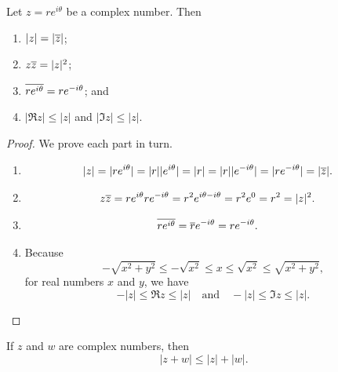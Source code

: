 \begin{theorem}
    Let \(z = re^{i\theta}\) be a complex number. Then
    \begin{enumerate}[label=(\alph*)]
        \item \(|z| = |\overline{z}|\);
        \item \(z\overline{z} = |z|^2\);
        \item \(\overline{re^{i\theta}} = re^{-i\theta}\); and
        \item \(|\Re z| \leq |z|\) and \(|\Im z| \leq |z|\).
    \end{enumerate}
    \label{thm:modulus-conjugate}
\end{theorem}

\begin{proof}
    We prove each part in turn.
    \begin{enumerate}[label=(\alph*)]
        \item \[
            \begin{aligned}
                |z| &= |re^{i\theta}| = |r||e^{i\theta}| = |r| = |r||e^{-i\theta}| = |re^{-i\theta}| = |\overline{z}|.
            \end{aligned}
        \]
        \item \[
            \begin{aligned}
                z\overline{z} &= re^{i\theta}re^{-i\theta} = r^2e^{i\theta - i\theta} = r^2e^0 = r^2 = |z|^2.
            \end{aligned}
        \]
        \item \[
            \begin{aligned}
                \overline{re^{i\theta}} &= \overline{r}e^{-i\theta} = re^{-i\theta}.
            \end{aligned}
        \]
        \item Because
        \[
            -\sqrt{x^2 + y^2} \leq -\sqrt{x^2} \leq x \leq \sqrt{x^2} \leq \sqrt{x^2 + y^2},
        \]
        for real numbers \(x\) and \(y\), we have
        \[
            -|z| \leq \Re z \leq |z| \quad \text{and} \quad -|z| \leq \Im z \leq |z|.
        \]
    \end{enumerate}
\end{proof}

\begin{theorem}
    If \(z\) and \(w\) are complex numbers, then
    \[
        |z + w| \leq |z| + |w|.
    \]
    \label{thm:triangle-inequality}
\end{theorem}

